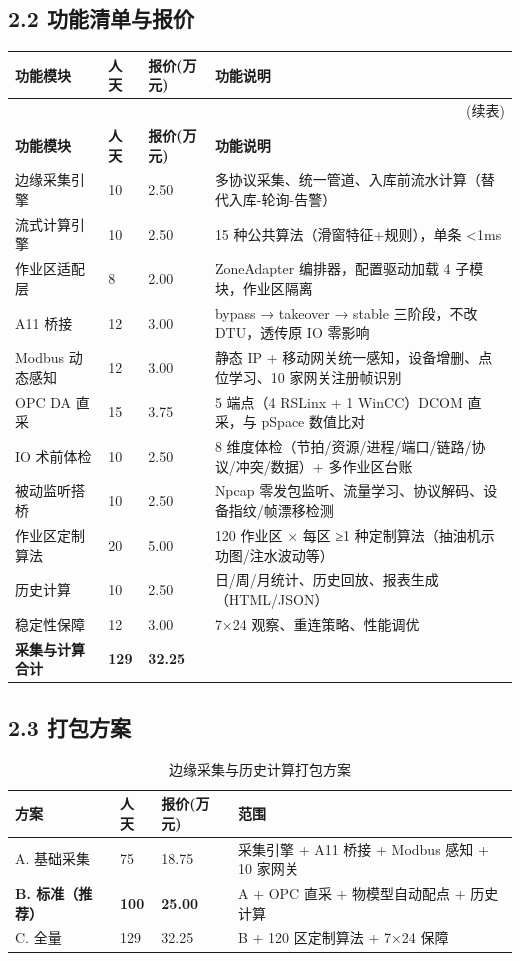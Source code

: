 \documentclass[11pt,a4paper]{ctexart}
\begin{document}
\subsection{2.2 功能清单与报价}

\begin{longtable}{p{4.2cm} p{2.2cm} p{2.2cm} p{4.8cm}}
\toprule
\textbf{功能模块} & \textbf{人天} & \textbf{报价(万元)} & \textbf{功能说明} \\
\midrule
\endfirsthead
\midrule
\multicolumn{4}{r}{(续表)} \\
\toprule
\textbf{功能模块} & \textbf{人天} & \textbf{报价(万元)} & \textbf{功能说明} \\
\midrule
\endhead
边缘采集引擎 & 10 & 2.50 & 多协议采集、统一管道、入库前流水计算（替代入库-轮询-告警） \\
流式计算引擎 & 10 & 2.50 & 15 种公共算法（滑窗特征+规则），单条 <1ms \\
作业区适配层 & 8 & 2.00 & ZoneAdapter 编排器，配置驱动加载 4 子模块，作业区隔离 \\
A11 桥接 & 12 & 3.00 & bypass → takeover → stable 三阶段，不改 DTU，透传原 IO 零影响 \\
Modbus 动态感知 & 12 & 3.00 & 静态 IP + 移动网关统一感知，设备增删、点位学习、10 家网关注册帧识别 \\
OPC DA 直采 & 15 & 3.75 & 5 端点（4 RSLinx + 1 WinCC）DCOM 直采，与 pSpace 数值比对 \\
IO 术前体检 & 10 & 2.50 & 8 维度体检（节拍/资源/进程/端口/链路/协议/冲突/数据）+ 多作业区台账 \\
被动监听搭桥 & 10 & 2.50 & Npcap 零发包监听、流量学习、协议解码、设备指纹/帧漂移检测 \\
作业区定制算法 & 20 & 5.00 & 120 作业区 × 每区 ≥1 种定制算法（抽油机示功图/注水波动等） \\
历史计算 & 10 & 2.50 & 日/周/月统计、历史回放、报表生成（HTML/JSON） \\
稳定性保障 & 12 & 3.00 & 7×24 观察、重连策略、性能调优 \\
\midrule
\textbf{采集与计算合计} & \textbf{129} & \textbf{32.25} & \\
\bottomrule
\end{longtable}

\subsection{2.3 打包方案}

\begin{table}[H]\centering
\caption{边缘采集与历史计算打包方案}
\begin{tabular}{p{4.5cm} p{2.5cm} p{2.5cm} p{3.5cm}}
\toprule
\textbf{方案} & \textbf{人天} & \textbf{报价(万元)} & \textbf{范围} \\
\midrule
A. 基础采集 & 75 & 18.75 & 采集引擎 + A11 桥接 + Modbus 感知 + 10 家网关 \\
\textbf{B. 标准（推荐）} & \textbf{100} & \textbf{25.00} & A + OPC 直采 + 物模型自动配点 + 历史计算 \\
C. 全量 & 129 & 32.25 & B + 120 区定制算法 + 7×24 保障 \\
\bottomrule
\end{tabular}
\end{table}
\end{document}
